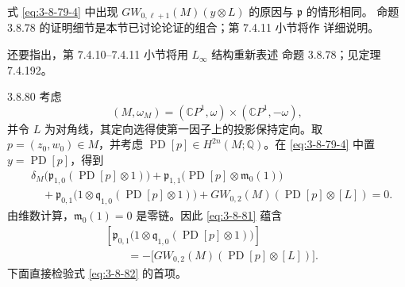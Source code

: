 式 \eqref{eq:3-8-79-4} 中出现
$GW_{0,\ell+1}(M)(y\otimes L)$ 的原因与 $\mathfrak p$ 的情形相同。
命题 3.8.78 的证明细节是本节已讨论论证的组合；第 7.4.11 小节将作
详细说明。

还要指出，第 7.4.10--7.4.11 小节将用 $L_\infty$ 结构重新表述
命题 3.8.78；见定理 7.4.192。

\begin{example}{3.8.80}\label{ex:3-8-80}
考虑
\[
 (M,\omega_M)
 = (\mathbb CP^1,\omega)\times(\mathbb CP^1,-\omega),
\]
并令 $L$ 为对角线，其定向选得使第一因子上的投影保持定向。取
$p=(z_0,w_0)\in M$，并考虑
$\operatorname{PD}[p]\in H^{2n}(M;\mathbb Q)$。在
\eqref{eq:3-8-79-4} 中置 $y=\operatorname{PD}[p]$，得到
\begin{equation}
\begin{aligned}
 &\delta_M\bigl(
 \mathfrak p_{1,0}(\operatorname{PD}[p]\otimes1)
 \bigr)
 +\mathfrak p_{1,1}\bigl(
 \operatorname{PD}[p]\otimes\mathfrak m_0(1)
 \bigr)\\
 &\quad+
 \mathfrak p_{0,1}\bigl(
 1\otimes\mathfrak q_{1,0}(\operatorname{PD}[p]\otimes1)
 \bigr)
 +GW_{0,2}(M)(\operatorname{PD}[p]\otimes[L])=0.
\end{aligned}
\tag{3.8.81}\label{eq:3-8-81}
\end{equation}
由维数计算，$\mathfrak m_0(1)=0$ 是零链。因此
\eqref{eq:3-8-81} 蕴含
\begin{equation}
\begin{aligned}
 &\left[
 \mathfrak p_{0,1}\bigl(
 1\otimes\mathfrak q_{1,0}(\operatorname{PD}[p]\otimes1)
 \bigr)
 \right]\\
 &\qquad=-
 \bigl[GW_{0,2}(M)(\operatorname{PD}[p]\otimes[L])\bigr].
\end{aligned}
\tag{3.8.82}\label{eq:3-8-82}
\end{equation}
下面直接检验式 \eqref{eq:3-8-82} 的首项。


\end{example}

